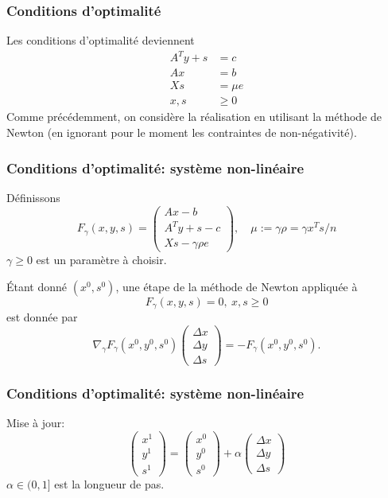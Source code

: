 \documentclass[usepdftitle=false,aspectratio=169]{beamer}
\begin{document}
\begin{frame}
\frametitle{Conditions d'optimalité}

Les conditions d'optimalité deviennent
\begin{align*}
A^Ty + s &= c \\
Ax &= b \\
Xs &= \mu e \\
x, s &\geq 0
\end{align*}
Comme précédemment, on considère la réalisation en utilisant la méthode de Newton (en ignorant pour le moment les contraintes de non-négativité).

\end{frame}

\begin{frame}
\frametitle{Conditions d'optimalité: système non-linéaire}

Définissons
$$
F_{\gamma} (x,y,s) =
\begin{pmatrix}
Ax-b \\
A^Ty + s - c \\
Xs - \gamma \rho e
\end{pmatrix},
\quad
\mu := \gamma \rho = \gamma x^Ts/n
$$
$\gamma \geq 0$ est un paramètre à choisir.

\mbox{}

Étant donné $(x^0, s^0)$, une étape de la méthode de Newton appliquée à
$$
F_{\gamma} (x,y,s) = 0,\ x,s\geq 0
$$
est donnée par
$$
\nabla_{\gamma} F_{\gamma} (x^0,y^0,s^0)
\begin{pmatrix}
\Delta x \\ \Delta y \\ \Delta s
\end{pmatrix}
= - F_{\gamma} (x^0,y^0,s^0).
$$

\end{frame}

\begin{frame}
\frametitle{Conditions d'optimalité: système non-linéaire}

Mise à jour:
$$
\begin{pmatrix} x^1 \\ y^1 \\ s^1 \end{pmatrix}
=
\begin{pmatrix} x^0 \\ y^0 \\ s^0 \end{pmatrix}
+\alpha
\begin{pmatrix}
\Delta x \\ \Delta y \\ \Delta s
\end{pmatrix}
$$
$\alpha \in (0,1]$ est la longueur de pas.

\end{frame}
\end{document}
